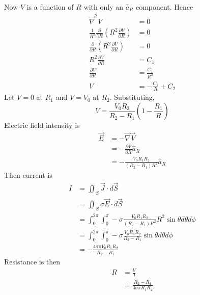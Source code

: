 \documentclass[answers]{exam}
\begin{document}
\begin{questions}
\begin{solution}
	Now $V$ is a function of $R$ with only an $\hat a_R$ component. Hence
	\begin{align*}
		\vec \nabla^2 V &= 0 \\
		\frac{1}{R^2} \frac{\partial}{\partial R}\left(R^2\frac{\partial V}{\partial R}\right) &= 0 \\
		\frac{\partial}{\partial R}\left(R^2\frac{\partial V}{\partial R}\right) &= 0 \\
		R^2\frac{\partial V}{\partial R} &= C_1 \\
		\frac{\partial V}{\partial R} &= \frac{C_1}{R^2} \\
		V &= -\frac{C_1}{R} + C_2
	\end{align*}
	Let $V=0$ at $R_1$ and $V=V_0$ at $R_2$. Substituting,
	$$V = \frac{V_0R_2}{R_2-R_1}\left(1-\frac{R_1}{R}\right)$$
	Electric field intensity is
	\begin{align*}
		\vec E &= -\vec \nabla \vec V \\
		       &= -\frac{\partial V}{\partial R} \hat a_R \\
		       &= -\frac{V_0R_1R_2}{(R_2-R_1)R^2} \hat a_R
	\end{align*}
	Then current is
	\begin{align*}
		I &= \iint_S \vec J \cdot d\vec S \\
		  &= \iint_S \sigma \vec E \cdot d\vec S \\
		  &= \int_0^{2\pi} \int_0^\pi -\sigma \frac{V_0R_1R_2}{(R_2-R_1)R^2} R^2\sin\theta d\theta d\phi \\
		  &= \int_0^{2\pi} \int_0^\pi -\sigma \frac{V_0R_1R_2}{R_2-R_1} \sin\theta d\theta d\phi \\
		  &= -\frac{4\sigma\pi V_0R_1R_2}{R_2-R_1}
	\end{align*}
	Resistance is then
	\begin{align*}
		R &= \frac{V}{I} \\
		  &= \frac{R_2-R_1}{4\sigma\pi R_1R_2}
	\end{align*}
\end{solution}



\end{questions}
\end{document}
